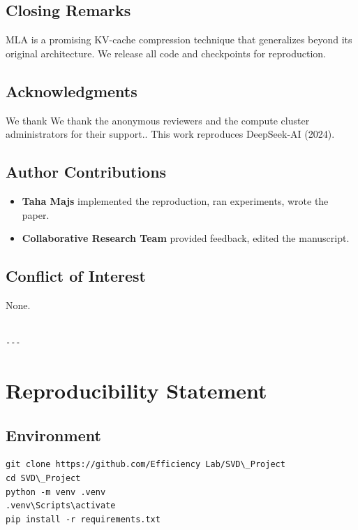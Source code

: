 \subsection{Closing Remarks}

MLA is a promising KV-cache compression technique that generalizes beyond 
its original architecture. We release all code and checkpoints for 
reproduction.

\subsection{Acknowledgments}

We thank We thank the anonymous reviewers and the compute cluster administrators for their support.. This work reproduces DeepSeek-AI (2024).

\subsection{Author Contributions}

\begin{itemize}
\item \textbf{Taha Majs} implemented the reproduction, ran experiments, wrote
  the paper.
\item \textbf{Collaborative Research Team} provided feedback, edited the manuscript.

\end{itemize}
\subsection{Conflict of Interest}

None.
\begin{lstlisting}

---
\end{lstlisting}


\section{Reproducibility Statement}

\subsection{Environment}

\begin{lstlisting}
git clone https://github.com/Efficiency Lab/SVD\_Project
cd SVD\_Project
python -m venv .venv
.venv\Scripts\activate
pip install -r requirements.txt
\end{lstlisting}

